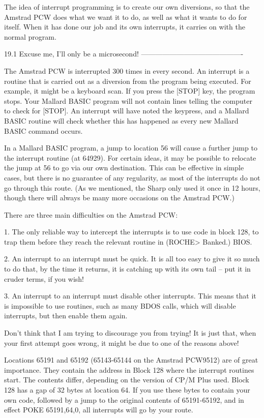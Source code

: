 The idea of interrupt programming is to create our own diversions, so that the 
Amstrad  PCW  does what we want it to do, as well as what it wants to  do  for 
itself.  When it has done our job and its own interrupts, it carries  on  with 
the normal program.


19.1 Excuse me, I'll only be a microsecond!
-------------------------------------------

The  Amstrad PCW is interrupted 300 times in every second. An interrupt  is  a 
routine  that is carried out as a diversion from the program  being  executed. 
For  example,  it might be a keyboard scan. If you press the [STOP]  key,  the 
program  stops. Your Mallard BASIC program will not contain lines telling  the 
computer to check for [STOP]. An interrupt will have noted the keypress, and a 
Mallard  BASIC  routine  will check whether this has  happened  as  every  new 
Mallard BASIC command occurs.

In a Mallard BASIC program, a jump to location 56 will cause a further jump to 
the  interrupt  routine (at 64929). For certain ideas, it may be  possible  to 
relocate  the jump at 56 to go via our own destination. This can be  effective 
in  simple cases, but there is no guarantee of any regularity, as most of  the 
interrupts do not go through this route. (As we mentioned, the Sharp only used 
it  once in 12 hours, though there will always be many more occasions  on  the 
Amstrad PCW.)

There are three main difficulties on the Amstrad PCW:

     1.  The only reliable way to intercept the interrupts is to use  code  in 
block  128,  to trap them before they reach the relevant  routine  in  (ROCHE> 
Banked.) BIOS.

     2. An interrupt to an interrupt must be quick. It is all too easy to give 
it so much to do that, by the time it returns, it is catching up with its  own 
tail -- put it in cruder terms, if you wish!

     3. An interrupt to an interrupt must disable other interrupts. This means 
that  it  is impossible to use routines, such as many BDOS calls,  which  will 
disable interrupts, but then enable them again.

Don't  think that I am trying to discourage you from trying! It is just  that, 
when  your  first attempt goes wrong, it might be due to one  of  the  reasons 
above!

Locations  65191 and 65192 (65143-65144 on the Amstrad PCW9512) are  of  great 
importance. They contain the address in Block 128 where the interrupt routines 
start. The contents differ, depending on the version of CP/M Plus used.  Block 
128  has a gap of 32 bytes at location 64. If you use these bytes  to  contain 
your own code, followed by a jump to the original contents of 65191-65192, and 
in effect POKE 65191,64,0, all interrupts will go by your route.

